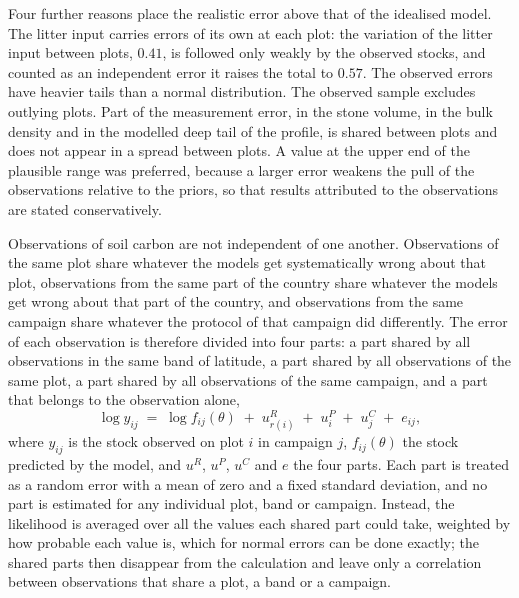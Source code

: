 \documentclass[11pt]{article}
\begin{document}
Four further reasons place the realistic error above that of the idealised model. The
litter input carries errors of its own at each plot: the variation of the litter input
between plots, $0.41$, is followed only weakly by the observed stocks, and counted as
an independent error it raises the total to $0.57$. The observed errors have heavier
tails than a normal distribution. The observed sample excludes outlying plots. Part of
the measurement error, in the stone volume, in the bulk density and in the modelled
deep tail of the profile, is shared between plots and does not appear in a spread
between plots. A value at the upper end of the plausible range was preferred, because
a larger error weakens the pull of the observations relative to the priors, so that
results attributed to the observations are stated conservatively.

Observations of soil carbon are not independent of one another. Observations of the
same plot share whatever the models get systematically wrong about that plot,
observations from the same part of the country share whatever the models get wrong
about that part of the country, and observations from the same campaign share whatever
the protocol of that campaign did differently. The error of each observation is
therefore divided into four parts: a part shared by all observations in the same band
of latitude, a part shared by all observations of the same plot, a part shared by all
observations of the same campaign, and a part that belongs to the observation alone,
\[
  \log y_{ij} \;=\; \log f_{ij}(\theta) \;+\; u^{R}_{r(i)} \;+\; u^{P}_{i} \;+\; u^{C}_{j} \;+\; e_{ij},
\]
where $y_{ij}$ is the stock observed on plot $i$ in campaign $j$, $f_{ij}(\theta)$ the
stock predicted by the model, and $u^{R}$, $u^{P}$, $u^{C}$ and $e$ the four parts.
Each part is treated as a random error with a mean of zero and a fixed standard
deviation, and no part is estimated for any individual plot, band or campaign.
Instead, the likelihood is averaged over all the values each shared part could take,
weighted by how probable each value is, which for normal errors can be done exactly;
the shared parts then disappear from the calculation and leave only a correlation
between observations that share a plot, a band or a campaign.
\end{document}
